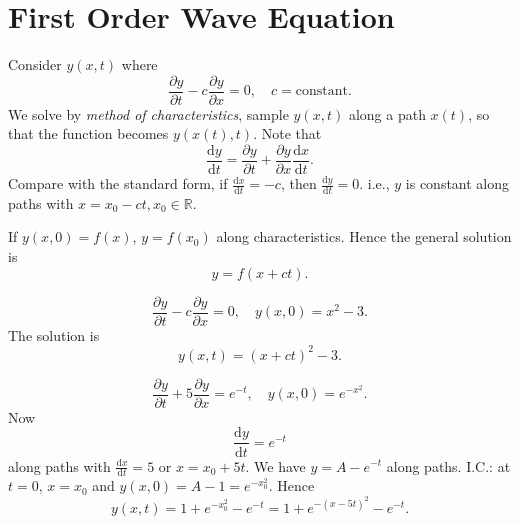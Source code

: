 \documentclass[10pt]{article}
\begin{document}
    \section{First Order Wave Equation}
    Consider $ y(x,t) $ where 
    \[
        \frac{\partial y}{\partial t}-c \frac{\partial y}{\partial x}=0,\quad c = \text{constant}.  
    \]
    We solve by \textit{method of characteristics}, sample $y(x,t)$ along a path $x(t)$, so that the function becomes $ y(x(t),t) $. Note that 
    \[
        \frac{\mathrm{d}y}{\mathrm{d}t} = \frac{\partial y}{\partial t}+\frac{\partial y}{\partial x}\frac{\mathrm{d}x}{\mathrm{d}t}.    
    \]
    Compare with the standard form, if $ \frac{\mathrm{d}x}{\mathrm{d}t}=-c  $, then $ \frac{\mathrm{d}y}{\mathrm{d}t}=0  $. i.e., $y$ is constant along paths with $ x=x_0-ct, x_0\in \mathbb{R} $.
    \begin{center}
      \end{center}
      If $ y(x,0)=f(x) $, $ y = f(x_0) $ along characteristics. Hence the general solution is 
      \[
          y=f(x+ct).
      \]
      \begin{example}
          \[
              \frac{\partial y}{\partial t}-c \frac{\partial y}{\partial x}=0, \quad y(x,0)=x^2-3.  
          \]
          The solution is 
          \[
              y(x,t)=(x+ct)^2-3.
          \]
      \end{example}
      \begin{example}
          \[
            \frac{\partial y}{\partial t}+5 \frac{\partial y}{\partial x}=e^{-t}, \quad y(x,0)=e^{-x^2}.
          \]
          Now 
          \[
              \frac{\mathrm{d}y}{\mathrm{d}t} = e^{-t} 
          \]
          along paths with $ \frac{\mathrm{d}x}{\mathrm{d}t} =5 $ or $ x=x_0+5t $. We have $ y=A-e^{-t} $ along paths. I.C.: at $t=0$, $x=x_0$ and $ y(x,0)=A-1=e^{-x_0^2} $. Hence 
          \[
              y(x,t)=1+e^{-x_0^2}-e^{-t} = 1+e^{-(x-5t)^2}-e^{-t}.
          \]
      \end{example}
\end{document}
